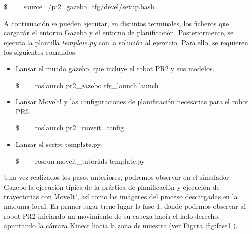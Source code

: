 \documentclass[12pt,spanish,chapterprefix, numbers=noenddot]{book}
\numberwithin{equation}{section}
\numberwithin{figure}{section}
\begin{document}
\$ \ \ \ \ source ~/pr2\_gazebo\_tfg/devel/setup.bash

A continuación se pueden ejecutar, en distintos terminales, los ficheros que cargarán el entorno Gazebo y el entorno de planificación. Posteriormente, se ejecuta la plantilla \textit{template.py} con la solución al ejercicio. Para ello, se requieren los siguientes comandos: 
\begin{itemize}
    \item Lanzar el mundo gazebo, que incluye el robot PR2 y sus modelos.
    
    \$ \ \ \ \ roslaunch pr2\_gazebo tfg\_launch.launch
    \item Lanzar MoveIt! y las configuraciones de planificación necesarias para el robot PR2.
    
    \$ \ \ \ \ roslaunch pr2\_moveit\_config 
    \item Lanzar el script template.py.
    
    \$ \ \ \ \ rosrun moveit\_tutorials template.py
\end{itemize}
Una vez realizados los pasos anteriores, podremos observar en el simulador Gazebo la ejecución típica de la práctica de planificación y ejecución de trayectorias con MoveIt!, así como las imágenes del proceso descargadas en la máquina local. 
En primer lugar tiene lugar la fase 1, donde podemos observar al robot PR2 iniciando un movimiento de su cabeza hacia el lado derecho, apuntando la cámara Kinect hacia la zona de muestra (ver Figura \ref{fig:fase1}).
\end{document}
